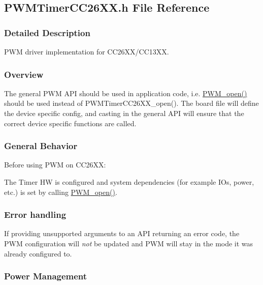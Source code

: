 \subsection{P\+W\+M\+Timer\+C\+C26\+X\+X.\+h File Reference}
\label{_p_w_m_timer_c_c26_x_x_8h}


\subsubsection{Detailed Description}
P\+W\+M driver implementation for C\+C26\+X\+X/\+C\+C13\+X\+X. 





\subsubsection*{Overview}

The general P\+W\+M A\+P\+I should be used in application code, i.\+e. \hyperlink{_p_w_m_8h_ac963beab0c5c6901bf852f175028aeaf}{P\+W\+M\+\_\+open()} should be used instead of P\+W\+M\+Timer\+C\+C26\+X\+X\+\_\+open(). The board file will define the device specific config, and casting in the general A\+P\+I will ensure that the correct device specific functions are called.

\subsubsection*{General Behavior}

Before using P\+W\+M on C\+C26\+X\+X\+:
\begin{DoxyItemize}
\item The Timer H\+W is configured and system dependencies (for example I\+Os, power, etc.) is set by calling \hyperlink{_p_w_m_8h_ac963beab0c5c6901bf852f175028aeaf}{P\+W\+M\+\_\+open()}.
\end{DoxyItemize}

\subsubsection*{Error handling}

If providing unsupported arguments to an A\+P\+I returning an error code, the P\+W\+M configuration will {\itshape not} be updated and P\+W\+M will stay in the mode it was already configured to.

\subsubsection*{Power Management}

